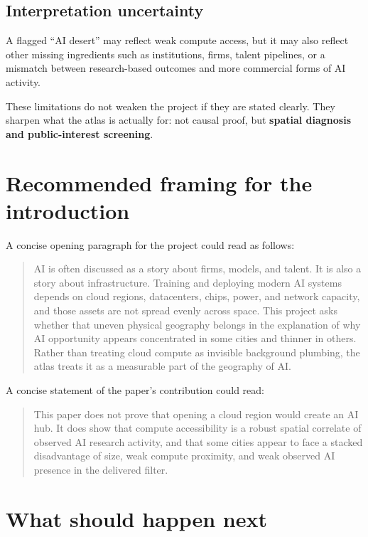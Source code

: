 \documentclass[11pt]{article}
\begin{document}
\subsection{Interpretation uncertainty}

A flagged ``AI desert'' may reflect weak compute access, but it may also reflect other missing ingredients such as institutions, firms, talent pipelines, or a mismatch between research-based outcomes and more commercial forms of AI activity.

These limitations do not weaken the project if they are stated clearly. They sharpen what the atlas is actually for: not causal proof, but \textbf{spatial diagnosis and public-interest screening}.

\section{Recommended framing for the introduction}

A concise opening paragraph for the project could read as follows:

\begin{quote}
AI is often discussed as a story about firms, models, and talent. It is also a story about infrastructure. Training and deploying modern AI systems depends on cloud regions, datacenters, chips, power, and network capacity, and those assets are not spread evenly across space. This project asks whether that uneven physical geography belongs in the explanation of why AI opportunity appears concentrated in some cities and thinner in others. Rather than treating cloud compute as invisible background plumbing, the atlas treats it as a measurable part of the geography of AI.
\end{quote}

A concise statement of the paper's contribution could read:

\begin{quote}
This paper does not prove that opening a cloud region would create an AI hub. It does show that compute accessibility is a robust spatial correlate of observed AI research activity, and that some cities appear to face a stacked disadvantage of size, weak compute proximity, and weak observed AI presence in the delivered filter.
\end{quote}

\section{What should happen next}
\end{document}
